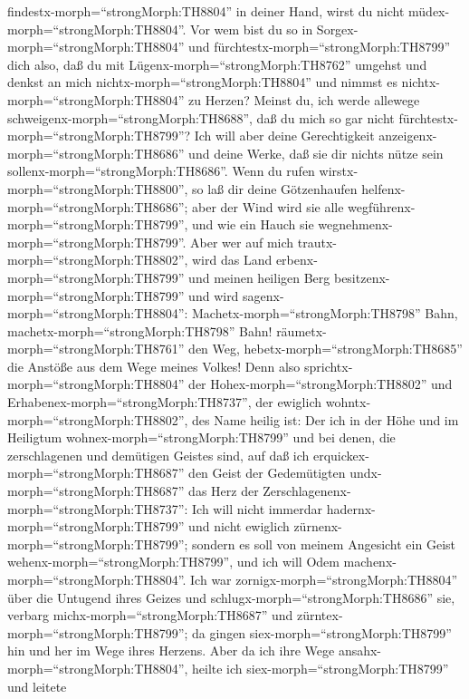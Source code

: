 findestx-morph=``strongMorph:TH8804'' in deiner Hand, wirst du nicht
müdex-morph=``strongMorph:TH8804''.  Vor wem bist du so in
Sorgex-morph=``strongMorph:TH8804'' und
fürchtestx-morph=``strongMorph:TH8799'' dich also, daß du mit
Lügenx-morph=``strongMorph:TH8762'' umgehst und denkst an mich
nichtx-morph=``strongMorph:TH8804'' und nimmst es
nichtx-morph=``strongMorph:TH8804'' zu Herzen? Meinst du, ich werde
allewege schweigenx-morph=``strongMorph:TH8688'', daß du mich so gar
nicht fürchtestx-morph=``strongMorph:TH8799''?  Ich will
aber deine Gerechtigkeit anzeigenx-morph=``strongMorph:TH8686'' und
deine Werke, daß sie dir nichts nütze sein
sollenx-morph=``strongMorph:TH8686''.  Wenn du rufen
wirstx-morph=``strongMorph:TH8800'', so laß dir deine Götzenhaufen
helfenx-morph=``strongMorph:TH8686''; aber der Wind wird sie alle
wegführenx-morph=``strongMorph:TH8799'', und wie ein Hauch sie
wegnehmenx-morph=``strongMorph:TH8799''. Aber wer auf mich
trautx-morph=``strongMorph:TH8802'', wird das Land
erbenx-morph=``strongMorph:TH8799'' und meinen heiligen Berg
besitzenx-morph=``strongMorph:TH8799''  und wird
sagenx-morph=``strongMorph:TH8804'':
Machetx-morph=``strongMorph:TH8798'' Bahn,
machetx-morph=``strongMorph:TH8798'' Bahn!
räumetx-morph=``strongMorph:TH8761'' den Weg,
hebetx-morph=``strongMorph:TH8685'' die Anstöße aus dem Wege meines
Volkes!  Denn also sprichtx-morph=``strongMorph:TH8804''
der Hohex-morph=``strongMorph:TH8802'' und
Erhabenex-morph=``strongMorph:TH8737'', der ewiglich
wohntx-morph=``strongMorph:TH8802'', des Name heilig ist: Der ich in der
Höhe und im Heiligtum wohnex-morph=``strongMorph:TH8799'' und bei denen,
die zerschlagenen und demütigen Geistes sind, auf daß ich
erquickex-morph=``strongMorph:TH8687'' den Geist der Gedemütigten
undx-morph=``strongMorph:TH8687'' das Herz der
Zerschlagenenx-morph=``strongMorph:TH8737'':  Ich will
nicht immerdar hadernx-morph=``strongMorph:TH8799'' und nicht ewiglich
zürnenx-morph=``strongMorph:TH8799''; sondern es soll von meinem
Angesicht ein Geist wehenx-morph=``strongMorph:TH8799'', und ich will
Odem machenx-morph=``strongMorph:TH8804''.  Ich war
zornigx-morph=``strongMorph:TH8804'' über die Untugend ihres Geizes und
schlugx-morph=``strongMorph:TH8686'' sie, verbarg
michx-morph=``strongMorph:TH8687'' und
zürntex-morph=``strongMorph:TH8799''; da gingen
siex-morph=``strongMorph:TH8799'' hin und her im Wege ihres Herzens.
 Aber da ich ihre Wege ansahx-morph=``strongMorph:TH8804'',
heilte ich siex-morph=``strongMorph:TH8799'' und leitete
